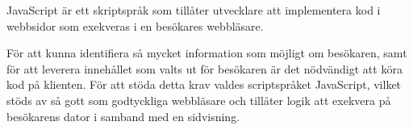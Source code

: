 JavaScript är ett skriptspråk som tillåter utvecklare att implementera kod i webbsidor som exekveras i en besökares webbläsare. 

För att kunna identifiera så mycket information som möjligt om besökaren, samt för att leverera innehållet som valts ut för besökaren är det nödvändigt att köra kod på klienten. För att stöda detta krav valdes scriptspråket JavaScript, vilket stöds av så gott som godtyckliga webbläsare och tillåter logik att exekvera på besökarens dator i samband med en sidvisning.

